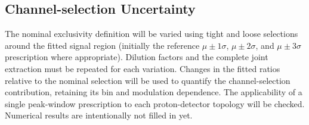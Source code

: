 \subsection{Channel-selection Uncertainty}\label{sec:channel_selection_uncertainty}
The nominal exclusivity definition will be varied using tight and loose selections around the fitted signal region (initially the reference $\mu\pm1\sigma$, $\mu\pm2\sigma$, and $\mu\pm3\sigma$ prescription where appropriate). Dilution factors and the complete joint extraction must be repeated for each variation. Changes in the fitted ratios relative to the nominal selection will be used to quantify the channel-selection contribution, retaining its bin and modulation dependence. The applicability of a single peak-window prescription to each proton-detector topology will be checked. Numerical results are intentionally not filled in yet.
